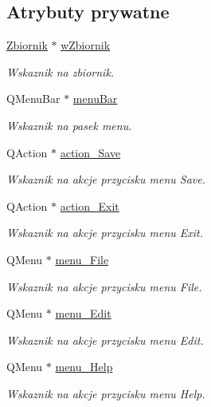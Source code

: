 \subsection*{Atrybuty prywatne}
\begin{DoxyCompactItemize}
\item 
\hyperlink{class_zbiornik}{Zbiornik} $\ast$ \hyperlink{class_okno_glowne_af2d1275209898ebdd5ab9de8ef78dffd}{w\-Zbiornik}
\begin{DoxyCompactList}\small\item\em Wskaznik na zbiornik. \end{DoxyCompactList}\item 
Q\-Menu\-Bar $\ast$ \hyperlink{class_okno_glowne_a5a87098d9d4bd868670f5a5e72023a0a}{menu\-Bar}
\begin{DoxyCompactList}\small\item\em Wskaznik na pasek menu. \end{DoxyCompactList}\item 
Q\-Action $\ast$ \hyperlink{class_okno_glowne_a2c2d825b6e5e0faa5eb368be4fc73b78}{action\-\_\-\-Save}
\begin{DoxyCompactList}\small\item\em Wskaznik na akcje przycisku menu Save. \end{DoxyCompactList}\item 
Q\-Action $\ast$ \hyperlink{class_okno_glowne_a579ef9901f57057368cb522ea5a9a5c3}{action\-\_\-\-Exit}
\begin{DoxyCompactList}\small\item\em Wskaznik na akcje przycisku menu Exit. \end{DoxyCompactList}\item 
Q\-Menu $\ast$ \hyperlink{class_okno_glowne_a1ba162db2d0b06b0f8963e61b3806875}{menu\-\_\-\-File}
\begin{DoxyCompactList}\small\item\em Wskaznik na akcje przycisku menu File. \end{DoxyCompactList}\item 
Q\-Menu $\ast$ \hyperlink{class_okno_glowne_a93afadd0ec22ce6a7e29acc5dd2423a2}{menu\-\_\-\-Edit}
\begin{DoxyCompactList}\small\item\em Wskaznik na akcje przycisku menu Edit. \end{DoxyCompactList}\item 
Q\-Menu $\ast$ \hyperlink{class_okno_glowne_ab17be6714913af0cdf4e7de7cb6210d1}{menu\-\_\-\-Help}
\begin{DoxyCompactList}\small\item\em Wskaznik na akcje przycisku menu Help. \end{DoxyCompactList}\item 

\end{DoxyCompactItemize}
